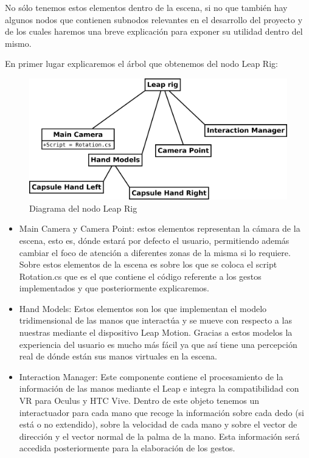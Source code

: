 \documentclass[a4paper,11pt]{article}
\begin{document}
No sólo tenemos estos elementos dentro de la escena, si no que también hay algunos nodos que contienen subnodos relevantes en el desarrollo del proyecto y de los cuales haremos una breve explicación para exponer su utilidad dentro del mismo.

\vspace{10px}

En primer lugar explicaremos el árbol que obtenemos del nodo Leap Rig:

\begin{figure}[!h]
	\includegraphics[scale=0.5]{./Imagenes/Leap_Rig.png}
	\caption{Diagrama del nodo Leap Rig}
	\label{leapRig}
\end{figure}

\begin{itemize}
	\item Main Camera y Camera Point: estos elementos representan la cámara de la escena, esto es, dónde estará por defecto el usuario, permitiendo además cambiar el foco de atención a diferentes zonas de la misma si lo requiere. Sobre estos elementos de la escena es sobre los que se coloca el script Rotation.cs que es el que contiene el código referente a los gestos implementados y que posteriormente explicaremos.
	\item Hand Models: Estos elementos son los que implementan el modelo tridimensional de las manos que interactúa y se mueve con respecto a las nuestras mediante el dispositivo Leap Motion. Gracias a estos modelos la experiencia del usuario es mucho más fácil ya que así tiene una percepción real de dónde están sus manos virtuales en la escena.
	\item Interaction Manager: Este componente contiene el procesamiento de la información de las manos mediante el Leap e integra la compatibilidad con VR para Oculus y HTC Vive. Dentro de este objeto tenemos un interactuador para cada mano que recoge la información sobre cada dedo (si está o no extendido), sobre la velocidad de cada mano y sobre el vector de dirección y el vector normal de la palma de la mano. Esta información será accedida posteriormente para la elaboración de los gestos.
\end{itemize}
\end{document}
